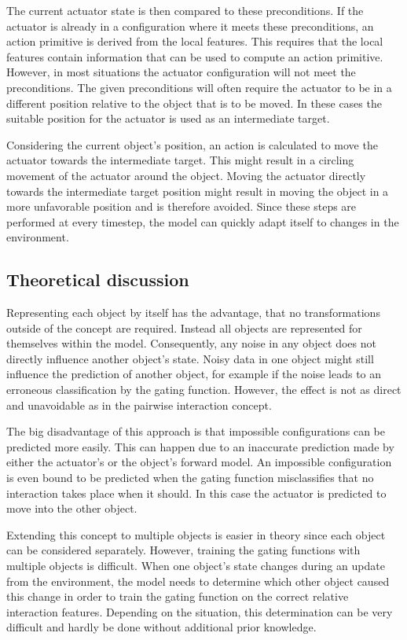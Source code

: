 The current actuator state is then compared to these preconditions. If the actuator is already in a configuration where it meets these preconditions, an action primitive is derived from the local features. This requires that the local features contain information that can be used to compute an action primitive.
However, in most situations the actuator configuration will not meet the preconditions. The given preconditions will often require the actuator to be in a different position relative to the object that is to be moved. In these cases the suitable position for the actuator is used as an intermediate target. 

Considering the current object's position, an action is calculated to move the actuator towards the intermediate target. This might result in a circling movement of the actuator around the object. Moving the actuator directly towards the intermediate target position might result in moving the object in a more unfavorable position and is therefore avoided. Since these steps are performed at every timestep, the model can quickly adapt itself to changes in the environment.
	
\subsection{Theoretical discussion}

Representing each object by itself has the advantage, that no transformations outside of the concept are required. Instead all objects are represented for themselves within the model. 
Consequently, any noise in any object does not directly influence another object's state. Noisy data in one object might still influence the prediction of another object, for example if the noise leads to an erroneous classification by the gating function. However, the effect is not as direct and unavoidable as in the pairwise interaction concept.

The big disadvantage of this approach is that impossible configurations can be predicted more easily. This can happen due to an inaccurate prediction made by either the actuator's or the object's forward model.
An impossible configuration is even bound to be predicted when the gating function misclassifies that no interaction takes place when it should. In this case the actuator is predicted to move into the other object.

Extending this concept to multiple objects is easier in theory since each object can be considered separately. However, training the gating functions with multiple objects is difficult. When one object's state changes during an update from the environment, the model needs to determine which other object caused this change in order to train the gating function on the correct relative interaction features. Depending on the situation, this determination can be very difficult and hardly be done without additional prior knowledge. 

